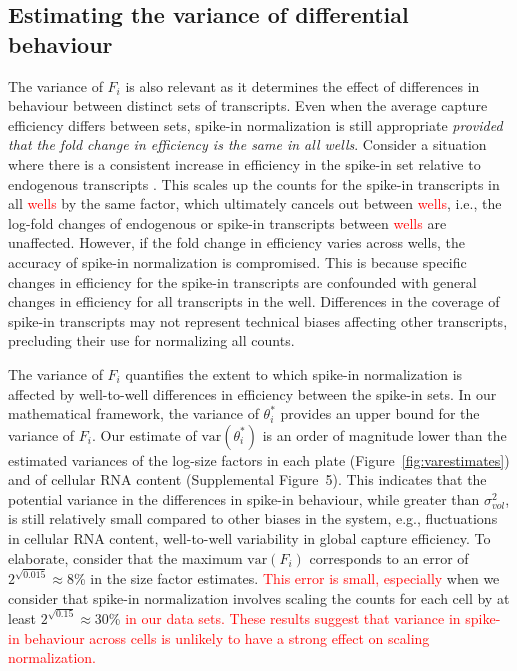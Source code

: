\documentclass{article}
\newcommand{\suppfigcell}{5}
\newcommand{\revised}[1]{\textcolor{red}{#1}}
\newcommand\variance{\mbox{var}}
\begin{document}
\subsection*{Estimating the variance of differential behaviour}
The variance of $F_i$ is also relevant as it determines the effect of differences in behaviour between distinct sets of transcripts.
Even when the average capture efficiency differs between sets, spike-in normalization is still appropriate \textit{provided that the fold change in efficiency is the same in all wells}.
Consider a situation where there is a consistent increase in efficiency in the spike-in set relative to endogenous transcripts \autocite{svensson2017power}.
This scales up the counts for the spike-in transcripts in all \revised{wells} by the same factor, which ultimately cancels out between \revised{wells}, i.e., the log-fold changes of endogenous or spike-in transcripts between \revised{wells} are unaffected.
However, if the fold change in efficiency varies across wells, the accuracy of spike-in normalization is compromised.
This is because specific changes in efficiency for the spike-in transcripts are confounded with general changes in efficiency for all transcripts in the well.
Differences in the coverage of spike-in transcripts may not represent technical biases affecting other transcripts, precluding their use for normalizing all counts.

The variance of $F_i$ quantifies the extent to which spike-in normalization is affected by well-to-well differences in efficiency between the spike-in sets.
In our mathematical framework, the variance of $\theta^*_i$ provides an upper bound for the variance of $F_i$.
Our estimate of $\variance(\theta^*_i)$ is an order of magnitude lower than the estimated variances of the log-size factors in each plate (Figure~\ref{fig:varestimates}) and of cellular RNA content (Supplemental Figure~\suppfigcell{}).
This indicates that the potential variance in the differences in spike-in behaviour, while greater than $\sigma^2_{vol}$, is still relatively small compared to other biases in the system, e.g., fluctuations in cellular RNA content, well-to-well variability in global capture efficiency.
To elaborate, consider that the maximum $\variance(F_i)$ corresponds to an error of $2^{\sqrt{0.015}} \approx 8$\% in the size factor estimates.
\revised{This error is small, especially} when we consider that spike-in normalization involves scaling the counts for each cell by at least $2^{\sqrt{0.15}} \approx 30$\% \revised{in our data sets.
These results suggest that variance in spike-in behaviour across cells is unlikely to have a strong effect on scaling normalization.}  
\end{document}
